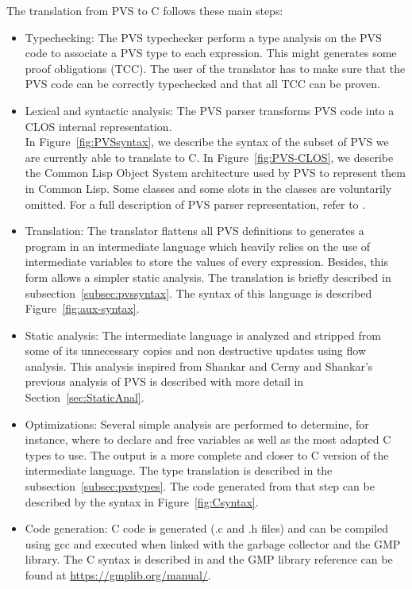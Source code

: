 \documentclass[12pt,a4paper]{article}
\begin{document}
The translation from PVS \cite{PVS:manuals} to C follows these main steps:
\begin{itemize}
\item Typechecking: The PVS typechecker \cite{PVS:userguide} perform a type analysis on the PVS code to associate a PVS type to each expression. This might generates some proof obligations (TCC). The user of the translator has to make sure that the PVS code can be correctly typechecked and that all TCC can be proven.

\item Lexical and syntactic analysis: The PVS parser transforms PVS \cite{PVS:language} code into a CLOS internal representation. \\

In Figure~\ref{fig:PVSsyntax}, we describe the syntax of the subset of PVS we are currently able to translate to C.
In Figure~\ref{fig:PVS-CLOS}, we describe the Common Lisp Object System architecture used by PVS to represent them in Common Lisp. Some classes and some slots in the classes are voluntarily omitted. For a full description of PVS parser representation, refer to \cite{PVS:api}.

\item Translation: The translator flattens all PVS definitions to generates a program in an intermediate language which heavily relies on the use of intermediate variables to store the values of every expression. Besides, this form allows a simpler static analysis. The translation is briefly described in subsection~\ref{subsec:pvssyntax}. The syntax of this language is described Figure~\ref{fig:aux-syntax}.

\item Static analysis: The intermediate language is analyzed and stripped from some of its unnecessary copies and non destructive updates using flow analysis. This analysis inspired from Shankar \cite{shankar02} and Cerny and Shankar's \cite{pavol} previous analysis of PVS is described with more detail in Section~\ref{sec:StaticAnal}.

\item Optimizations: Several simple analysis are performed to determine, for instance, where to declare and free variables as well as the most adapted C types to use. The output is a more complete and closer to C version of the intermediate language. The type translation is described in the subsection~\ref{subsec:pvstypes}. The code generated from that step can be described by the syntax in Figure~\ref{fig:Csyntax}. 

\item Code generation: C code is generated (.c and .h files) and can be compiled using gcc and executed when linked with the garbage collector and the GMP library. The C syntax is described in \cite{huss2004c} and the GMP library reference can be found at \href{https://gmplib.org/manual/}{https://gmplib.org/manual/}.
\end{itemize}
\end{document}
